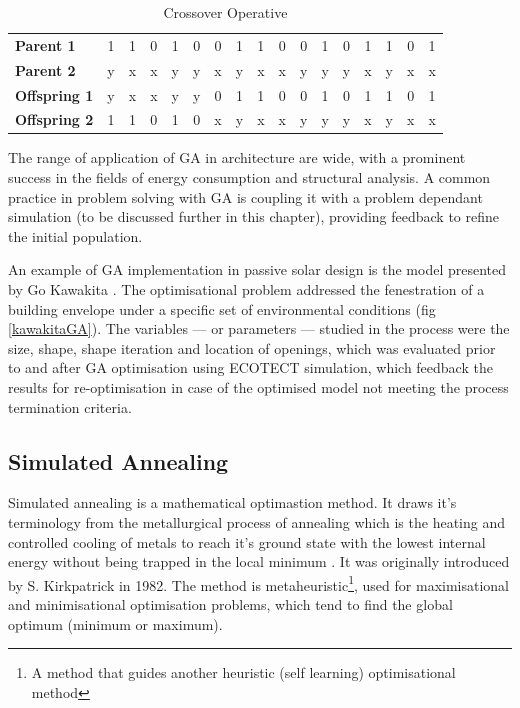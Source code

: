 \begin{table}[h]
\begin{tabular}{l|| ccccc|ccccccccccc}
\textbf{Parent 1}&1&1&0&1&0&0&1&1&0&0&1&0&1&1&0&1\\
\textbf{Parent 2}&y&x&x&y&y&x&y&x&x&y&y&y&x&y&x&x\\\hline
\textbf{Offspring 1}&y&x&x&y&y&0&1&1&0&0&1&0&1&1&0&1\\
\textbf{Offspring 2}&1&1&0&1&0&x&y&x&x&y&y&y&x&y&x&x\\
\end{tabular}
\caption[Crossover Operative]{Crossover Operative \cite{whitley94}}
\label{CRSOVR}
\end{table}

The range of application of GA in architecture are wide, with a prominent success in the fields of energy consumption and structural analysis. A common practice in problem solving with GA is coupling it with a problem dependant simulation (to be discussed further in this chapter), providing feedback to refine the initial population.

An example of GA implementation in passive solar design is the model presented by Go Kawakita \cite{kawakita08}. The optimisational problem addressed the fenestration of a building envelope under a specific set of environmental conditions (fig \ref{kawakitaGA}). The variables --- or parameters --- studied in the process were the size, shape, shape iteration and location of openings, which was evaluated prior to and after GA optimisation using ECOTECT simulation, which feedback the results for re-optimisation in case of the optimised model not meeting the process termination criteria.

\clearpage
\subsection{Simulated Annealing}

Simulated annealing is a mathematical optimastion method. It draws it's terminology from the metallurgical process of annealing which is the heating and controlled cooling of metals to reach it's ground state with the lowest internal energy without being trapped in the local minimum \cite{lam88}. It was originally introduced by S. Kirkpatrick in 1982. The method is metaheuristic\footnote{A method that guides another heuristic (self learning) optimisational method}, used for maximisational and minimisational optimisation problems, which tend to find the global optimum (minimum or maximum).

